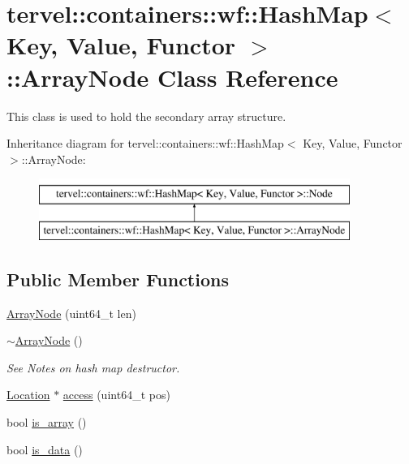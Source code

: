 \hypertarget{classtervel_1_1containers_1_1wf_1_1_hash_map_1_1_array_node}{}\section{tervel\+:\+:containers\+:\+:wf\+:\+:Hash\+Map$<$ Key, Value, Functor $>$\+:\+:Array\+Node Class Reference}
\label{classtervel_1_1containers_1_1wf_1_1_hash_map_1_1_array_node}


This class is used to hold the secondary array structure.  


Inheritance diagram for tervel\+:\+:containers\+:\+:wf\+:\+:Hash\+Map$<$ Key, Value, Functor $>$\+:\+:Array\+Node\+:\begin{figure}[H]
\begin{center}
\leavevmode
\includegraphics[height=2.000000cm]{classtervel_1_1containers_1_1wf_1_1_hash_map_1_1_array_node}
\end{center}
\end{figure}
\subsection*{Public Member Functions}
\begin{DoxyCompactItemize}
\item 
\hyperlink{classtervel_1_1containers_1_1wf_1_1_hash_map_1_1_array_node_aabfc235f98e6ec20a3f9b717161f1077}{Array\+Node} (uint64\+\_\+t len)
\item 
\hyperlink{classtervel_1_1containers_1_1wf_1_1_hash_map_1_1_array_node_af9e186fa57cd92c58acc614ccb327337}{$\sim$\+Array\+Node} ()
\begin{DoxyCompactList}\small\item\em See Notes on hash map destructor. \end{DoxyCompactList}\item 
\hyperlink{classtervel_1_1containers_1_1wf_1_1_hash_map_ab2c04cbf19034689a795208e0108fe8a}{Location} $\ast$ \hyperlink{classtervel_1_1containers_1_1wf_1_1_hash_map_1_1_array_node_a8f747038046227b9b175aa2b83f50bdf}{access} (uint64\+\_\+t pos)
\item 
bool \hyperlink{classtervel_1_1containers_1_1wf_1_1_hash_map_1_1_array_node_ad5eeaa33f2410902fbd86083e24730ca}{is\+\_\+array} ()
\item 
bool \hyperlink{classtervel_1_1containers_1_1wf_1_1_hash_map_1_1_array_node_a21681cf8d295b98084b1bebc5e434a7d}{is\+\_\+data} ()
\end{DoxyCompactItemize}
